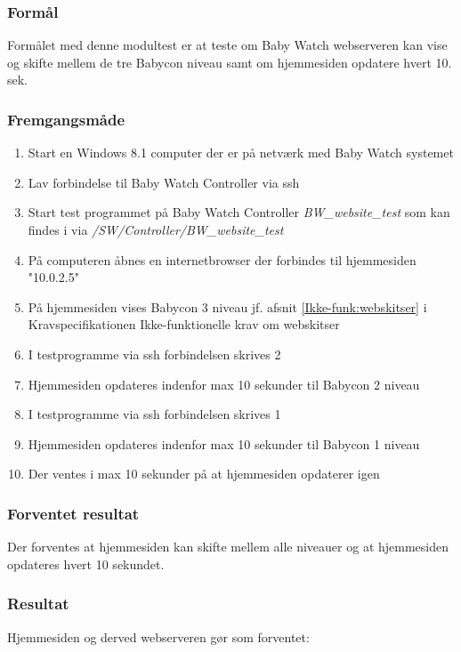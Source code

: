 \subsubsection*{Formål}
Formålet med denne modultest er at teste om Baby Watch webserveren kan vise og skifte mellem de tre Babycon niveau samt om hjemmesiden opdatere hvert 10. sek.

\subsubsection*{Fremgangsmåde}
\begin{enumerate}
\item Start en Windows 8.1 computer \citep{website:Windows_8_1} der er på netværk med Baby Watch systemet
\item Lav forbindelse til Baby Watch Controller via ssh
\item Start test programmet på Baby Watch Controller \textit{BW\_website\_test} som kan findes i \citep{cd} via \textit{/SW/Controller/BW\_website\_test}
\item På computeren åbnes en internetbrowser der forbindes til hjemmesiden "10.0.2.5"
\item På hjemmesiden vises Babycon 3 niveau jf. afsnit \vref{Ikke-funk:webskitser} i Kravspecifikationen Ikke-funktionelle krav om webskitser
\item I testprogramme via ssh forbindelsen skrives 2
\item Hjemmesiden opdateres indenfor max 10 sekunder til Babycon 2 niveau
\item I testprogramme via ssh forbindelsen skrives 1
\item Hjemmesiden opdateres indenfor max 10 sekunder til Babycon 1 niveau
\item Der ventes i max 10 sekunder på at hjemmesiden opdaterer igen
\end{enumerate}

\subsubsection*{Forventet resultat} 
Der forventes at hjemmesiden kan skifte mellem alle niveauer og at hjemmesiden opdateres hvert 10 sekundet.

\subsubsection*{Resultat} 
Hjemmesiden og derved webserveren gør som forventet:


